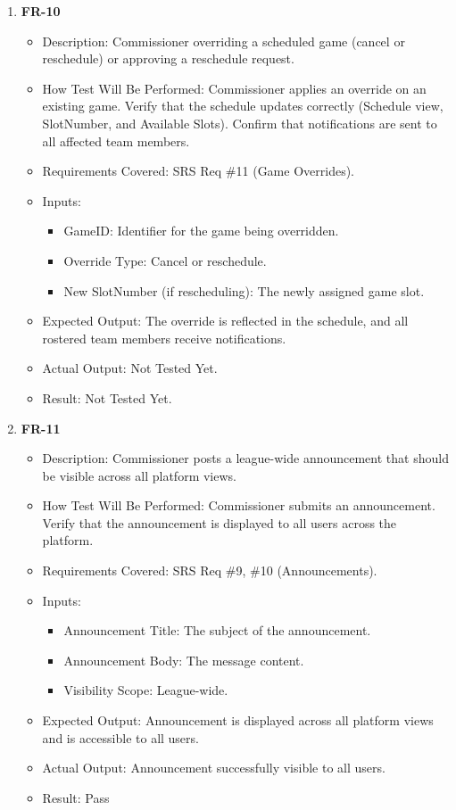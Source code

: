 \documentclass[12pt, titlepage]{article}
\begin{document}
\begin{enumerate}
    \item \textbf{FR-10}  
      \begin{itemize}
          \item Description: Commissioner overriding a scheduled game (cancel or reschedule) or approving a reschedule request.
          \item How Test Will Be Performed: Commissioner applies an override on an existing game. Verify that the schedule updates correctly (Schedule view, SlotNumber, and Available Slots). Confirm that notifications are sent to all affected team members.
          \item Requirements Covered: SRS Req \#11 (Game Overrides).
          \item Inputs:  
              \begin{itemize}
                  \item GameID: Identifier for the game being overridden.  
                  \item Override Type: Cancel or reschedule.  
                  \item New SlotNumber (if rescheduling): The newly assigned game slot.  
              \end{itemize}
          \item Expected Output: The override is reflected in the schedule, and all rostered team members receive notifications.
          \item Actual Output: Not Tested Yet.
          \item Result: Not Tested Yet.
      \end{itemize}

      \item \textbf{FR-11}  
      \begin{itemize}
          \item Description: Commissioner posts a league-wide announcement that should be visible across all platform views.
          \item How Test Will Be Performed: Commissioner submits an announcement. Verify that the announcement is displayed to all users across the platform.
          \item Requirements Covered: SRS Req \#9, \#10 (Announcements).
          \item Inputs:  
              \begin{itemize}
                  \item Announcement Title: The subject of the announcement.
                  \item Announcement Body: The message content.
                  \item Visibility Scope: League-wide.
              \end{itemize}
          \item Expected Output: Announcement is displayed across all platform views and is accessible to all users.
          \item Actual Output: Announcement successfully visible to all users.
          \item Result: Pass
      \end{itemize}
\end{enumerate}
\end{document}
